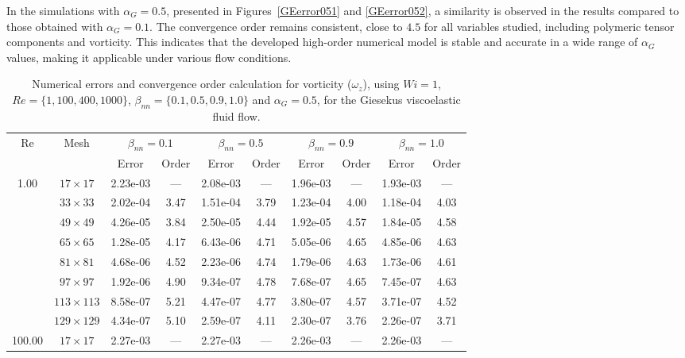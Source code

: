 \documentclass[preprint, 12pt]{elsarticle}
\begin{document}
In the simulations with $\alpha_G = 0.5$, presented in Figures~\ref{GEerror051} and \ref{GEerror052}, a similarity is observed in the results compared to those obtained with $\alpha_G = 0.1$. The convergence order remains consistent, close to $4.5$ for all variables studied, including polymeric tensor components and vorticity. This indicates that the developed high-order numerical model is stable and accurate in a wide range of $\alpha_G$ values, making it applicable under various flow conditions. \begin{center}
\begin{table}[H]
\caption{Numerical errors and convergence order calculation for vorticity ($\omega_{z}$), using \mbox{$Wi=1$}, $Re=\{1,100,400,1000\}$, $\beta_{nn}=\{0.1,0.5,0.9,1.0\}$ and $\alpha_G = 0.5$, for the Giesekus viscoelastic fluid flow.\label{tab_GiesekusWzalphaG05Resumida}}
\scriptsize{
    \begin{tabular*}{\textwidth}{@{\extracolsep\fill}cccccccccc@{}}
    \hline
    \multirow{2}{*}{$\operatorname{Re}$} & \multirow{2}{*}{Mesh} & \multicolumn{2}{c}{$\beta_{nn}=0.1$}  & \multicolumn{2}{c}{$\beta_{nn}=0.5$}  & \multicolumn{2}{c}{$\beta_{nn}=0.9$}  & \multicolumn{2}{c}{$\beta_{nn}=1.0$}\\ %
     & & Error & Order & Error & Order & Error & Order & Error & Order \\
    \hline
    \multirow{7}{*}{1.00} & $17\times 17$ & 2.23e-03 & --- & 2.08e-03 & --- & 1.96e-03 & --- & 1.93e-03 & --- \\
    & $33\times 33$ & 2.02e-04 & 3.47 & 1.51e-04 & 3.79 & 1.23e-04 & 4.00 & 1.18e-04 & 4.03 \\
    & $49\times 49$ & 4.26e-05 & 3.84 & 2.50e-05 & 4.44 & 1.92e-05 & 4.57 & 1.84e-05 & 4.58 \\
    & $65\times 65$ & 1.28e-05 & 4.17 & 6.43e-06 & 4.71 & 5.05e-06 & 4.65 & 4.85e-06 & 4.63 \\
    & $81\times 81$ & 4.68e-06 & 4.52 & 2.23e-06 & 4.74 & 1.79e-06 & 4.63 & 1.73e-06 & 4.61 \\
    & $97\times 97$ & 1.92e-06 & 4.90 & 9.34e-07 & 4.78 & 7.68e-07 & 4.65 & 7.45e-07 & 4.63 \\
    & $113\times 113$ & 8.58e-07 & 5.21 & 4.47e-07 & 4.77 & 3.80e-07 & 4.57 & 3.71e-07 & 4.52 \\
    & $129\times 129$ & 4.34e-07 & 5.10 & 2.59e-07 & 4.11 & 2.30e-07 & 3.76 & 2.26e-07 & 3.71 \\
    \hline
    \multirow{7}{*}{100.00} & $17\times 17$ & 2.27e-03 & --- & 2.27e-03 & --- & 2.26e-03 & --- & 2.26e-03 & --- \\

\end{tabular*}}
\end{table}
\end{center}
\end{document}
